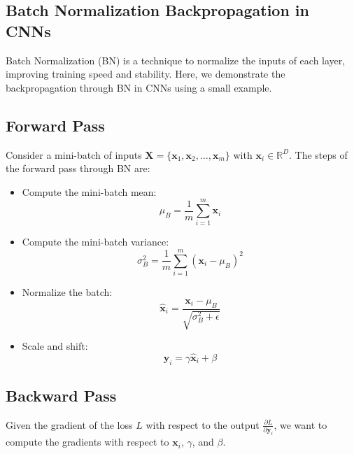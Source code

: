 \documentclass{article}
\begin{document}
\subsection{Batch Normalization Backpropagation in CNNs}

Batch Normalization (BN) is a technique to normalize the inputs of each layer, improving training speed and stability. Here, we demonstrate the backpropagation through BN in CNNs using a small example.

\subsection{Forward Pass}

Consider a mini-batch of inputs \( \mathbf{X} = \{ \mathbf{x}_1, \mathbf{x}_2, \dots, \mathbf{x}_m \} \) with \( \mathbf{x}_i \in \mathbb{R}^D \). The steps of the forward pass through BN are:

\begin{itemize}
    \item Compute the mini-batch mean:
    \begin{equation}
    \mu_B = \frac{1}{m} \sum_{i=1}^{m} \mathbf{x}_i
    \end{equation}

    \item Compute the mini-batch variance:
    \begin{equation}
    \sigma_B^2 = \frac{1}{m} \sum_{i=1}^{m} (\mathbf{x}_i - \mu_B)^2
    \end{equation}

    \item Normalize the batch:
    \begin{equation}
    \hat{\mathbf{x}}_i = \frac{\mathbf{x}_i - \mu_B}{\sqrt{\sigma_B^2 + \epsilon}}
    \end{equation}

    \item Scale and shift:
    \begin{equation}
    \mathbf{y}_i = \gamma \hat{\mathbf{x}}_i + \beta
    \end{equation}
\end{itemize}

\subsection{Backward Pass}

Given the gradient of the loss \( L \) with respect to the output \( \frac{\partial L}{\partial \mathbf{y}_i} \), we want to compute the gradients with respect to \( \mathbf{x}_i \), \( \gamma \), and \( \beta \).
\end{document}
